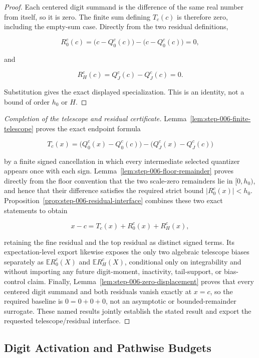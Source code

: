 \begin{proof}
Each centered digit summand is the difference of the same real number from itself, so it is zero. The finite sum defining \(T_c(c)\) is therefore zero, including the empty-sum case. Directly from the two residual definitions,

\[
R_0^c(c)
=\bigl(c-Q_0^c(c)\bigr)-\bigl(c-Q_0^c(c)\bigr)=0,
\]

and

\[
R_H^c(c)=Q_J^c(c)-Q_J^c(c)=0.
\]

Substitution gives the exact displayed specialization. This is an identity, not a bound of order \(h_0\) or \(H\).
\end{proof}

\begin{proof}[Completion of the telescope and residual certificate]
Lemma~\ref{lem:step-006-finite-telescope} proves the exact endpoint formula

\[
T_c(x)
=\bigl(Q_0^c(x)-Q_0^c(c)\bigr)
-\bigl(Q_J^c(x)-Q_J^c(c)\bigr)
\]

by a finite signed cancellation in which every intermediate selected quantizer appears once with each sign. Lemma~\ref{lem:step-006-floor-remainder} proves directly from the floor convention that the two scale-zero remainders lie in \([0,h_0)\), and hence that their difference satisfies the required strict bound \(\lvert R_0^c(x)\rvert<h_0\). Proposition~\ref{prop:step-006-residual-interface} combines these two exact statements to obtain

\[
x-c=T_c(x)+R_0^c(x)+R_H^c(x),
\]

retaining the fine residual and the top residual as distinct signed terms. Its expectation-level export likewise exposes the only two algebraic telescope biases separately as \(\mathbb E R_0^c(X)\) and \(\mathbb E R_H^c(X)\), conditional only on integrability and without importing any future digit-moment, inactivity, tail-support, or bias-control claim. Finally, Lemma~\ref{lem:step-006-zero-displacement} proves that every centered digit summand and both residuals vanish exactly at \(x=c\), so the required baseline is \(0=0+0+0\), not an asymptotic or bounded-remainder surrogate. These named results jointly establish the stated result and export the requested telescope/residual interface.
\end{proof}

\subsection{Digit Activation and Pathwise Budgets}\label{app:step-007}

